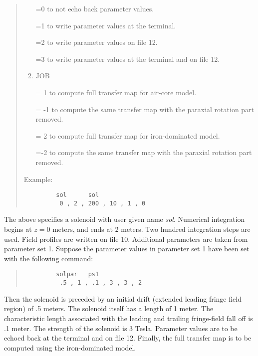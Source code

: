 \begin{quotation}
\begin{enumerate}
             =0 to not echo back parameter values.

             =1 to write parameter values at the terminal.

             =2 to write parameter values on file 12.

             =3 to write parameter values at the terminal and on
			 file 12.
      \item  JOB

             = 1 to compute full transfer map for air-core model.

             = -1 to compute the same transfer map with the paraxial rotation part
                  \hspace*{2em}removed.

              = 2 to compute full transfer map for iron-dominated model.

              =-2 to compute the same transfer map with the paraxial rotation part
                  \hspace*{2em}removed.


\end{enumerate}

\vspace{5mm}
\noindent     Example:
\begin{verbatim}
         sol      sol
          0 , 2 , 200 , 10 , 1 , 0
\end{verbatim}
\end{quotation}
The above specifies a solenoid with user given name {\em sol}.  Numerical integration begins at $z=0$ meters, and ends at 2 meters.  Two hundred integration steps are used.  Field profiles are written on file 10.  Additional parameters are taken from parameter set 1.  Suppose the parameter values in parameter set 1 have been set with the following command:
\begin{quotation}
\begin{verbatim}
         solpar   ps1
          .5 , 1 , .1 , 3 , 3 , 2
\end{verbatim}
\end{quotation}
Then the solenoid is preceded by an initial drift (extended leading fringe field region) of .5 meters.  The solenoid itself has a length of 1 meter.  The characteristic length associated with the leading and trailing fringe-field fall off is .1 meter.  The strength of the solenoid is 3 Tesla.  Parameter values are to be echoed back at the terminal and on file 12.  Finally, the full transfer map is to be computed using the iron-dominated model.

